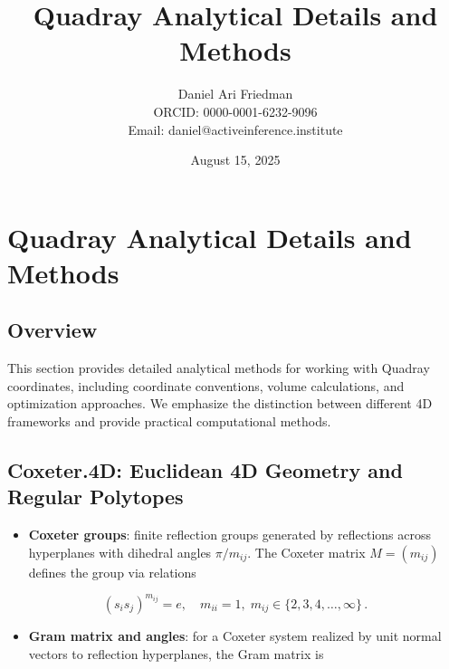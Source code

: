 \documentclass[
  10pt,
]{article}
\title{Quadray Analytical Details and Methods}
\author{Daniel Ari Friedman\\ ORCID: 0000-0001-6232-9096\\ Email: daniel@activeinference.institute}
\date{August 15, 2025}
\providecommand{\tightlist}{%
  \setlength{\itemsep}{0pt}\setlength{\parskip}{0pt}}
\begin{document}
\maketitle

{
\hypersetup{linkcolor=black}
\setcounter{tocdepth}{3}
\tableofcontents
}
\hypertarget{quadray-analytical-details-and-methods}{%
\section{Quadray Analytical Details and
Methods}\label{quadray-analytical-details-and-methods}}

\hypertarget{overview}{%
\subsection{Overview}\label{overview}}

This section provides detailed analytical methods for working with
Quadray coordinates, including coordinate conventions, volume
calculations, and optimization approaches. We emphasize the distinction
between different 4D frameworks and provide practical computational
methods.

\hypertarget{coxeter.4d-euclidean-4d-geometry-and-regular-polytopes}{%
\subsection{Coxeter.4D: Euclidean 4D Geometry and Regular
Polytopes}\label{coxeter.4d-euclidean-4d-geometry-and-regular-polytopes}}

\begin{itemize}
\tightlist
\item
  \textbf{Coxeter groups}: finite reflection groups generated by
  reflections across hyperplanes with dihedral angles \(\pi/m_{ij}\).
  The Coxeter matrix \(M = (m_{ij})\) defines the group via relations
\end{itemize}

\begin{equation}\label{eq:coxeter_relations}
(s_i s_j)^{m_{ij}} = e,\quad m_{ii}=1,\; m_{ij}\in\{2,3,4,\ldots,\infty\}\,.
\end{equation}

\begin{itemize}
\tightlist
\item
  \textbf{Gram matrix and angles}: for a Coxeter system realized by unit
  normal vectors to reflection hyperplanes, the Gram matrix is
\end{itemize}
\end{document}
